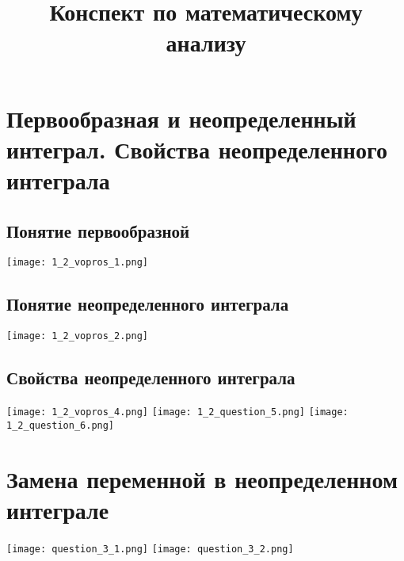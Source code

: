 \documentclass[a4paper,12pt]{article}
\begin{document}
\title{Конспект по математическому анализу}
\author{}
\date{}
\maketitle

\tableofcontents
\newpage

\section{Первообразная и неопределенный интеграл. Свойства неопределенного интеграла}

\subsection{Понятие первообразной}
\texttt{[image: 1\_2\_vopros\_1.png]}

\subsection{Понятие неопределенного интеграла}
\texttt{[image: 1\_2\_vopros\_2.png]}

\subsection{Свойства неопределенного интеграла}
\texttt{[image: 1\_2\_vopros\_4.png]}
\texttt{[image: 1\_2\_question\_5.png]}
\texttt{[image: 1\_2\_question\_6.png]}

\section{Замена переменной в неопределенном интеграле}
\texttt{[image: question\_3\_1.png]}
\texttt{[image: question\_3\_2.png]}
\end{document}
